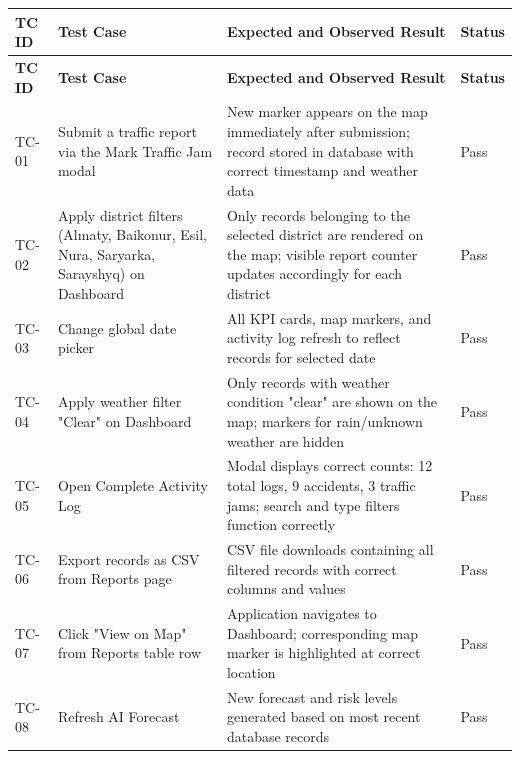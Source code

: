 \documentclass[12pt,a4paper]{report}
\begin{document}
\begin{tabularx}{\textwidth}{|p{1.4cm}
                  |p{4cm}
                  |X
                  |p{1.2cm}|}


\hline
\textbf{TC ID} & \textbf{Test Case} & \textbf{Expected and Observed Result} & \textbf{Status} \\
\hline
\endfirsthead

\hline
\textbf{TC ID} & \textbf{Test Case} & \textbf{Expected and Observed Result} & \textbf{Status} \\
\hline
\endhead

    TC-01 & Submit a traffic report via the Mark Traffic Jam modal &
    New marker appears on the map immediately after submission; record stored in database with correct timestamp and weather data &
    Pass \\
    \hline

    TC-02 & Apply district filters (Almaty, Baikonur, Esil, Nura, Saryarka, Sarayshyq) on Dashboard &
    Only records belonging to the selected district are rendered on the map;  
    visible report counter updates accordingly for each district &
    Pass \\
    \hline

    TC-03 & Change global date picker &
    All KPI cards, map markers, and activity log refresh to reflect records for selected date &
    Pass \\
    \hline

    TC-04 & Apply weather filter "Clear" on Dashboard &
    Only records with weather condition "clear" are shown on the map;  
    markers for rain/unknown weather are hidden &
    Pass \\
    \hline

    TC-05 & Open Complete Activity Log &
    Modal displays correct counts: 12 total logs, 9 accidents, 3 traffic jams;  
    search and type filters function correctly &
    Pass \\
    \hline

    TC-06 & Export records as CSV from Reports page &
    CSV file downloads containing all filtered records with correct columns and values &
    Pass \\
    \hline

    TC-07 & Click "View on Map" from Reports table row &
    Application navigates to Dashboard; corresponding map marker is highlighted at correct location &
    Pass \\
    \hline

    TC-08 & Refresh AI Forecast &
    New forecast and risk levels generated based on most recent database records &
    Pass \\
    \hline


\end{tabularx}
\end{document}

